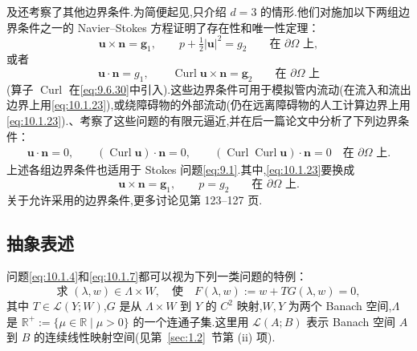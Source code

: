 及还考察了其他边界条件.为简便起见,只介绍 \(d=3\) 的情形.他们对施加以下两组边界条件之一的 Navier--Stokes 方程证明了存在性和唯一性定理：
\begin{equation}\label{eq:10.1.23}
  \boldsymbol{u}\times\boldsymbol{n}=\boldsymbol{g}_1,\qquad
  p+\tfrac12|\boldsymbol{u}|^2=g_2\qquad\text{在 }\partial\Omega\text{ 上},
\end{equation}
或者
\begin{equation}\label{eq:10.1.24}
  \boldsymbol{u}\cdot\boldsymbol{n}=g_1,\qquad
  \operatorname{Curl}\boldsymbol{u}\times\boldsymbol{n}=\boldsymbol{g}_2
       \qquad\text{在 }\partial\Omega\text{ 上}
\end{equation}
(算子 \(\operatorname{Curl}\) 在\eqref{eq:9.6.30}中引入).这些边界条件可用于模拟管内流动(在流入和流出边界上用\eqref{eq:10.1.23}),或绕障碍物的外部流动(仍在远离障碍物的人工计算边界上用\eqref{eq:10.1.23}).、考察了这些问题的有限元逼近,并在后一篇论文中分析了下列边界条件：
\begin{equation}\label{eq:10.1.25}
  \begin{gathered}
  \boldsymbol{u}\cdot\boldsymbol{n}=0,\qquad
  (\operatorname{Curl}\boldsymbol{u})\cdot\boldsymbol{n}=0,\qquad
  (\operatorname{Curl}\operatorname{Curl}\boldsymbol{u})\cdot\boldsymbol{n}=0
        \quad\text{在 }\partial\Omega\text{ 上}.
  \end{gathered}
\end{equation}
上述各组边界条件也适用于 Stokes 问题\eqref{eq:9.1}.其中,\eqref{eq:10.1.23}要换成
\begin{equation}\label{eq:10.1.26}
  \boldsymbol{u}\times\boldsymbol{n}=\boldsymbol{g}_1,\qquad p=g_2
     \qquad\text{在 }\partial\Omega\text{ 上}.
\end{equation}
关于允许采用的边界条件,更多讨论见第 123–127 页.

\subsection{抽象表述}\label{sec:10.1.2}

问题\eqref{eq:10.1.4}和\eqref{eq:10.1.7}都可以视为下列一类问题的特例：
\begin{equation}\label{eq:10.1.27}
  \text{求 }(\lambda,w)\in\Lambda\times W,\quad\text{使}\quad
       F(\lambda,w):=w+TG(\lambda,w)=0,
\end{equation}
其中 \(T\in\mathcal L(Y;W)\),\(G\) 是从 \(\Lambda\times W\) 到 \(Y\) 的 \(C^2\) 映射,\(W,Y\) 为两个 Banach 空间,\(\Lambda\) 是 \(\mathbb R^+:=\{\mu\in\mathbb R\mid\mu>0\}\) 的一个连通子集.这里用 \(\mathcal L(A;B)\) 表示 Banach 空间 \(A\) 到 \(B\) 的连续线性映射空间(见第~\ref{sec:1.2}~节第 (ii) 项).

